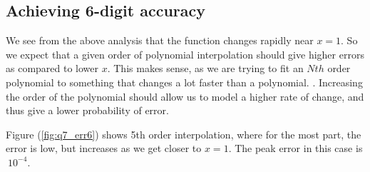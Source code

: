 \documentclass[11pt]{article}
\begin{document}
 

\subsection{Achieving 6-digit accuracy}

We see from the above analysis that the function changes rapidly near $x=1$. So we expect that a given order of polynomial interpolation should give higher errors as compared to lower $x$. This makes sense, as we are trying to fit an $Nth$ order polynomial to something that changes a lot faster than a polynomial. . Increasing the order of the polynomial should allow us to model a higher rate of change, and thus give a lower probability of error.

Figure (\ref{fig:q7_err6}) shows 5th order interpolation, where for the most part, the error is low, but increases as we get closer to $x=1$. The peak error in this case is $~10^{-4}$. 
\end{document}
